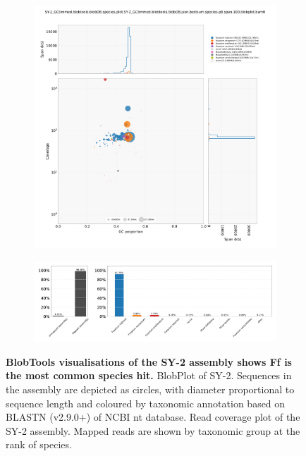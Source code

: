 \begin{figure}[hp!]
    \centering
    \begin{subfigure}[]{0.9\textwidth}
        \centering
        \includegraphics[width=\textwidth]{Appendices/SY-2_GCtimmed.blobtools.blobDB.species.plot.SY-2_GCtimmed.blobtools.blobDB.json.bestsum.species.p8.span.100.blobplot.bam0.png}
        \caption{}
        \label{fig:BlobPlot-SY-2}
    \end{subfigure}
    \begin{subfigure}[]{0.9\textwidth}
        \centering
        \includegraphics[width=\textwidth]{Appendices/SY-2_GCtimmed.blobtools.blobDB.species.plot.SY-2_GCtimmed.blobtools.blobDB.json.bestsum.species.p8.span.100.blobplot.read_cov.bam0.png}
        \caption{}
        \label{fig:BlobPlot_readcov-SY-2}
    \end{subfigure}
    \caption[BlobTools visualisations of the SY-2 assembly]{\textbf{BlobTools visualisations of the SY-2 assembly shows \acf{Ff} is the most common species hit.}
         BlobPlot of SY-2. Sequences in the assembly are depicted as circles, with diameter proportional to sequence length and coloured by taxonomic annotation based on BLASTN (v2.9.0+) of NCBI nt database.
         Read coverage plot of the SY-2 assembly. Mapped reads are shown by taxonomic group at the rank of species.}
        \label{fig:SY-2:BlobTools}
\end{figure}

